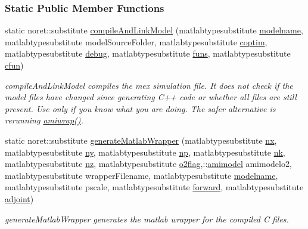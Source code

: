 \subsubsection*{Static Public Member Functions}
\begin{DoxyCompactItemize}
\item 
static noret\+::substitute \mbox{\hyperlink{classamimodel_a16e01624de4534ac1d1992bd685e2f56}{compile\+And\+Link\+Model}} (matlabtypesubstitute \mbox{\hyperlink{classamimodel_a71bca9c21a6de42d8079ade31cb61044}{modelname}}, matlabtypesubstitute model\+Source\+Folder, matlabtypesubstitute \mbox{\hyperlink{classamimodel_ad99abcd270ac97546c46292ebc6c2e0a}{coptim}}, matlabtypesubstitute \mbox{\hyperlink{classamimodel_a0514aabed091ee5e2f35766eb01eced6}{debug}}, matlabtypesubstitute \mbox{\hyperlink{classamimodel_af80b2560853c3df2b09fef2a198cf5b8}{funs}}, matlabtypesubstitute \mbox{\hyperlink{classamimodel_afec809c626a350367485aa6aaea6b585}{cfun}})
\begin{DoxyCompactList}\small\item\em compile\+And\+Link\+Model compiles the mex simulation file. It does not check if the model files have changed since generating C++ code or whether all files are still present. Use only if you know what you are doing. The safer alternative is rerunning \mbox{\hyperlink{amiwrap_8m_a183dd11adc4bd525147faa2590ea325b}{amiwrap()}}. \end{DoxyCompactList}\item 
static noret\+::substitute \mbox{\hyperlink{classamimodel_aed66701025485d8fa04c20c5bae32a83}{generate\+Matlab\+Wrapper}} (matlabtypesubstitute \mbox{\hyperlink{classamimodel_a84e4236f07668a770c27567f1f9615ff}{nx}}, matlabtypesubstitute \mbox{\hyperlink{classamimodel_a289ca425eb368f1d582b6be2be0d3dfc}{ny}}, matlabtypesubstitute \mbox{\hyperlink{classamimodel_a6f6e2fe71b05c4c2f2d967ce9ca02dfd}{np}}, matlabtypesubstitute \mbox{\hyperlink{classamimodel_afd6bea572754e0c3c320664bdccf0200}{nk}}, matlabtypesubstitute \mbox{\hyperlink{classamimodel_a79f11413e5bfe18a0e71e17574399ad5}{nz}}, matlabtypesubstitute \mbox{\hyperlink{classamimodel_a2b89e3b4e249878a2d436ee337952c4f}{o2flag}},\+::\mbox{\hyperlink{classamimodel}{amimodel}} amimodelo2, matlabtypesubstitute wrapper\+Filename, matlabtypesubstitute \mbox{\hyperlink{classamimodel_a71bca9c21a6de42d8079ade31cb61044}{modelname}}, matlabtypesubstitute pscale, matlabtypesubstitute \mbox{\hyperlink{classamimodel_a81e42e48c9c72814166c8f7cd414ce24}{forward}}, matlabtypesubstitute \mbox{\hyperlink{classamimodel_ab6d500b41cf50693452415caca31d32e}{adjoint}})
\begin{DoxyCompactList}\small\item\em generate\+Matlab\+Wrapper generates the matlab wrapper for the compiled C files. \end{DoxyCompactList}\end{DoxyCompactItemize}
